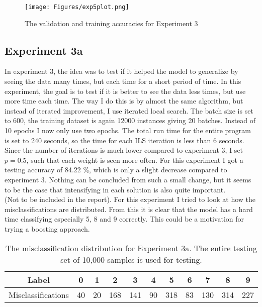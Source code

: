 

\begin{figure}[H]
    \centering
    \texttt{[image: Figures/exp5plot.png]}
    \caption{The validation and training accuracies for Experiment 3}
    \label{Figure 4}
\end{figure}

\subsection{Experiment 3a}
In experiment 3, the idea was to test if it helped the model to generalize by seeing the data many times, but each time for a short period of time. In this experiment, the goal is to test if it is better to see the data less times, but use more time each time. The way I do this is by almost the same algorithm, but instead of iterated improvement, I use iterated local search. The batch size is set to 600, the training dataset is again 12000 instances giving 20 batches. Instead of 10 epochs I now only use two epochs. The total run time for the entire program is set to 240 seconds, so the time for each ILS iteration is less than 6 seconds. Since the number of iterations is much lower compared to experiment 3, I set $p = 0.5$, such that each weight is seen more often. For this experiment I got a testing accuracy of 84.22 \%, which is only a slight decrease compared to experiment 3. Nothing can be concluded from such a small change, but it seems to be the case that intensifying in each solution is also quite important. \\

(Not to be included in the report). For this experiment I tried to look at how the misclassifications are distributed. From this it is clear that the model has a hard time classifying especially 5, 8 and 9 correctly. This could be a motivation for trying a boosting approach. 

\begin{table}[H]
    \centering
    \begin{tabular}{|c|c|c|c|c|c|c|c|c|c|c|}
    \hline
    Label              & 0  & 1  & 2   & 3   & 4  & 5   & 6  & 7   & 8   & 9   \\ \hline
    Misclassifications & 40 & 20 & 168 & 141 & 90 & 318 & 83 & 130 & 314 & 227 \\ \hline
    \end{tabular}
    \caption{The misclassification distribution for Experiment 3a. The entire testing set of 10,000 samples is used for testing. }
    \label{Misclassifications_exp3a}
\end{table}

